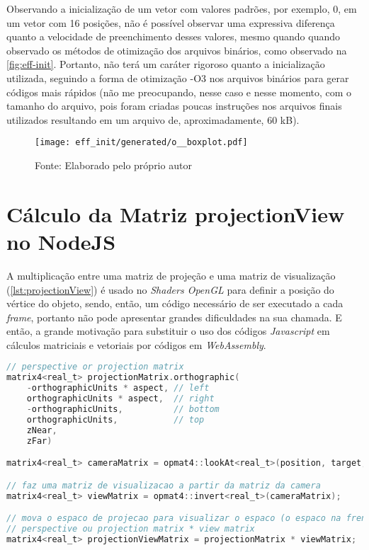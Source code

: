 \documentclass{article}
\begin{document}
Observando a inicialização de um vetor com valores padrões, por exemplo, 0, em um vetor com 16 posições, não é possível observar uma expressiva diferença quanto a velocidade de preenchimento desses valores, mesmo quando quando observado os métodos de otimização dos arquivos binários, como observado na \autoref{fig:eff-init}. Portanto, não terá um caráter rigoroso quanto a inicialização utilizada, seguindo a forma de otimização -O3 nos arquivos binários para gerar códigos mais rápidos (não me preocupando, nesse caso e nesse momento, com o tamanho do arquivo, pois foram criadas poucas instruções nos arquivos finais utilizados resultando em um arquivo de, aproximadamente, 60 kB).

\begin{figure}[H]
    \centering
    
    \vspace{5pt}
    \texttt{[image: eff\_init/generated/o\_\_boxplot.pdf]}
    \vspace{5pt}
    {\par\small Fonte: Elaborado pelo próprio autor}
    
    \label{fig:eff-init}
\end{figure}

\section*{Cálculo da Matriz projectionView no NodeJS}

A multiplicação entre uma matriz de projeção e uma matriz de visualização (\autoref{lst:projectionView}) é usado no \textit{Shaders OpenGL} para definir a posição do vértice do objeto, sendo, então, um código necessário de ser executado a cada \textit{frame}, portanto não pode apresentar grandes dificuldades na sua chamada. E então, a grande motivação para substituir o uso dos códigos \textit{Javascript} em cálculos matriciais e vetoriais por códigos em \textit{WebAssembly}.

\begin{lstlisting}[language=c,style=m_lststyle,label=lst:projectionView,caption=Cálculo da Matriz projectionView]
// perspective or projection matrix
matrix4<real_t> projectionMatrix.orthographic(
    -orthographicUnits * aspect, // left
    orthographicUnits * aspect,  // right
    -orthographicUnits,          // bottom
    orthographicUnits,           // top
    zNear,
    zFar)

matrix4<real_t> cameraMatrix = opmat4::lookAt<real_t>(position, target, yAxis);

// faz uma matriz de visualizacao a partir da matriz da camera
matrix4<real_t> viewMatrix = opmat4::invert<real_t>(cameraMatrix);

// mova o espaco de projecao para visualizar o espaco (o espaco na frente da camera)
// perspective ou projection matrix * view matrix
matrix4<real_t> projectionViewMatrix = projectionMatrix * viewMatrix;
\end{lstlisting}
\end{document}
